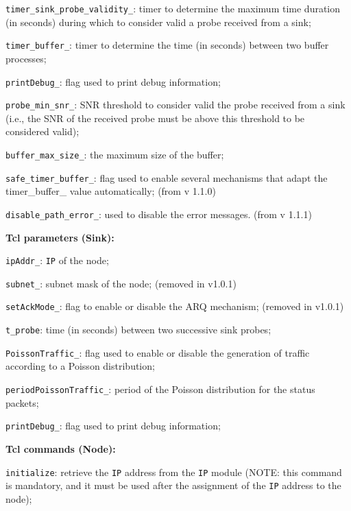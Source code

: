 \begin{description}
\begin{description}
 	 \item {\tt timer\_sink\_probe\_validity\_}: timer to determine the maximum time duration (in seconds) during which to consider valid a probe received from a sink;
 	 \item {\tt timer\_buffer\_}: timer to determine the time (in seconds) between two buffer processes; 	 
 	 \item {\tt printDebug\_}: flag used to print debug information; 	 
 	 \item {\tt probe\_min\_snr\_}: SNR threshold to consider valid the probe received from a sink (i.e., the SNR of the received probe must be above this threshold to be considered valid); 	 
 	 \item {\tt buffer\_max\_size\_}: the maximum size of the buffer;
 	 \item {\tt safe\_timer\_buffer\_}: flag used to enable several mechanisms that adapt the timer\_buffer\_ value automatically; (from v 1.1.0)
 	 \item {\tt disable\_path\_error\_}: used to disable the error messages. (from v 1.1.1)
 	\end{description}
   \item {\bf Tcl parameters (Sink):}
    \begin{description}
     \item {\tt ipAddr\_}: {\tt IP} of the node;
   	 \item {\tt subnet\_}: subnet mask of the node; (removed in v1.0.1)
   	 \item {\tt setAckMode\_}: flag to enable or disable the ARQ mechanism; (removed in v1.0.1)
   	 \item {\tt t\_probe}: time (in seconds) between two successive sink probes;
   	 \item {\tt PoissonTraffic\_}: flag used to enable or disable the generation of traffic according to a Poisson distribution;
   	 \item {\tt periodPoissonTraffic\_}: period of the Poisson distribution for the status packets;
     \item {\tt printDebug\_}: flag used to print debug information; 	  
    \end{description}
   \item {\bf Tcl commands (Node):} 
    \begin{description}
    \item {\tt initialize}: retrieve the {\tt IP} address from the {\tt IP} module (NOTE: this command is mandatory, and it must be used after the assignment of the {\tt IP} address to the node);

\end{description}
\end{description}
